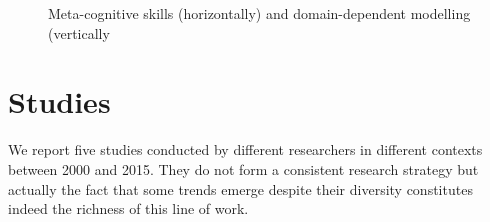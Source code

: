 \documentclass[natbib]{svjour3}
\newcommand{\Model}[3]{{$\mathcal{M}^{\circ}(#1, #2, #3)$}}
\begin{document}
\begin{figure}[htb]
\centering


\caption{\small Meta-cognitive skills (horizontally) and domain-dependent modelling (vertically}

\label{mm_rectangle}
\end{figure}






\section{Studies}

We report five studies conducted  by different researchers in different contexts between 2000 and 2015. They do not form a consistent research strategy but actually the fact that some trends emerge despite their diversity constitutes indeed the richness of this line of work.
\end{document}
